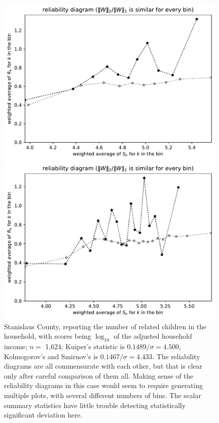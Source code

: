 \documentclass{article}
\begin{document}
\begin{figure}
\begin{centering}
\parbox{\imsize}{\includegraphics[width=\imsize]
{./codes/weighted/County_of_Stanislaus-NRC/equierrs10}}
\quad\quad
\parbox{\imsize}{\includegraphics[width=\imsize]
{./codes/weighted/County_of_Stanislaus-NRC/equierrs20}}

\end{centering}
\caption{Stanislaus County, reporting the number of related children
         in the household, with scores being $\log_{10}$
         of the adjusted household income;
         $n =$ 1,624; Kuiper's statistic is $0.1489 / \sigma = 4.500$,
         Kolmogorov's and Smirnov's is $0.1467 / \sigma = 4.433$.
The reliability diagrams are all commensurate with each other,
but that is clear only after careful comparison of them all.
Making sense of the reliability diagrams in this case would seem to require
generating multiple plots, with several different numbers of bins.
The scalar summary statistics have little trouble detecting
statistically significant deviation here.
}
\label{stanislaus}
\end{figure}
\end{document}
